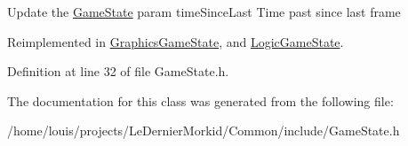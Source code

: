 Update the \hyperlink{class_common_1_1_game_state}{Game\+State} param time\+Since\+Last Time past since last frame 

Reimplemented in \hyperlink{class_graphics_game_state_a5a2543a4cdd551c98f4540707bc7213e}{Graphics\+Game\+State}, and \hyperlink{class_logic_game_state_a144a2deb659d903956bd955d86c4d6b7}{Logic\+Game\+State}.



Definition at line 32 of file Game\+State.\+h.



The documentation for this class was generated from the following file\+:\begin{DoxyCompactItemize}
\item 
/home/louis/projects/\+Le\+Dernier\+Morkid/\+Common/include/Game\+State.\+h\end{DoxyCompactItemize}
